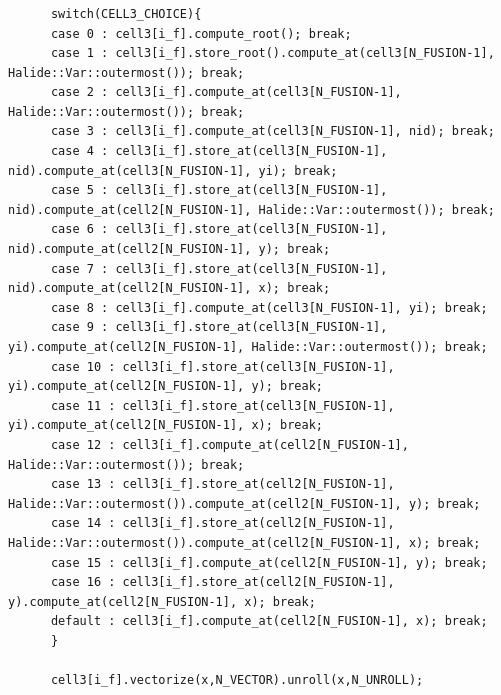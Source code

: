 \documentclass[dvipdfmx,cjk]{beamer}
\begin{document}
\begin{frame}[fragile]\frametitle{}
\begingroup \fontsize{8pt}{9pt}\selectfont
\begin{verbatim}
      switch(CELL3_CHOICE){
      case 0 : cell3[i_f].compute_root(); break;
      case 1 : cell3[i_f].store_root().compute_at(cell3[N_FUSION-1], Halide::Var::outermost()); break;
      case 2 : cell3[i_f].compute_at(cell3[N_FUSION-1], Halide::Var::outermost()); break;
      case 3 : cell3[i_f].compute_at(cell3[N_FUSION-1], nid); break;
      case 4 : cell3[i_f].store_at(cell3[N_FUSION-1], nid).compute_at(cell3[N_FUSION-1], yi); break;
      case 5 : cell3[i_f].store_at(cell3[N_FUSION-1], nid).compute_at(cell2[N_FUSION-1], Halide::Var::outermost()); break;
      case 6 : cell3[i_f].store_at(cell3[N_FUSION-1], nid).compute_at(cell2[N_FUSION-1], y); break;
      case 7 : cell3[i_f].store_at(cell3[N_FUSION-1], nid).compute_at(cell2[N_FUSION-1], x); break;
      case 8 : cell3[i_f].compute_at(cell3[N_FUSION-1], yi); break;
      case 9 : cell3[i_f].store_at(cell3[N_FUSION-1], yi).compute_at(cell2[N_FUSION-1], Halide::Var::outermost()); break;
      case 10 : cell3[i_f].store_at(cell3[N_FUSION-1], yi).compute_at(cell2[N_FUSION-1], y); break;
      case 11 : cell3[i_f].store_at(cell3[N_FUSION-1], yi).compute_at(cell2[N_FUSION-1], x); break;
      case 12 : cell3[i_f].compute_at(cell2[N_FUSION-1], Halide::Var::outermost()); break;
      case 13 : cell3[i_f].store_at(cell2[N_FUSION-1], Halide::Var::outermost()).compute_at(cell2[N_FUSION-1], y); break;
      case 14 : cell3[i_f].store_at(cell2[N_FUSION-1], Halide::Var::outermost()).compute_at(cell2[N_FUSION-1], x); break;
      case 15 : cell3[i_f].compute_at(cell2[N_FUSION-1], y); break;
      case 16 : cell3[i_f].store_at(cell2[N_FUSION-1], y).compute_at(cell2[N_FUSION-1], x); break;
      default : cell3[i_f].compute_at(cell2[N_FUSION-1], x); break;
      }

      cell3[i_f].vectorize(x,N_VECTOR).unroll(x,N_UNROLL);
\end{verbatim} 
\endgroup
\end{frame}
\end{document}
